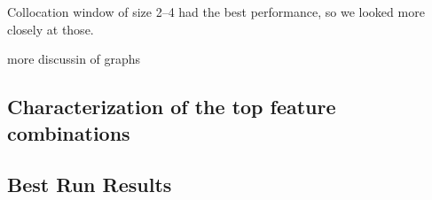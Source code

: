 \documentclass{article}
\begin{document}
Collocation window of size 2--4 had the best performance, so we looked more closely at those.


more discussin of graphs


\subsection{Characterization of the top feature combinations}


\subsection{Best Run Results}
\end{document}
